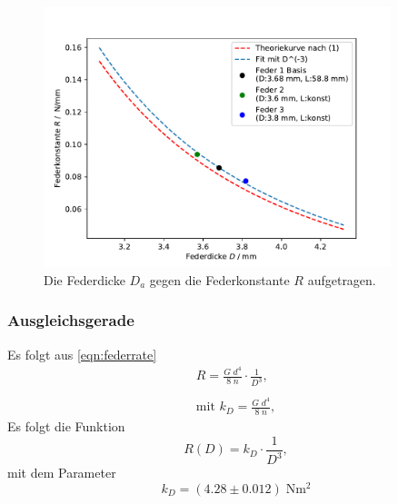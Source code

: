 \begin{figure}[H]
  \center
  \includegraphics[width=0.9\textwidth]{plots/dicke_konstante_dia.pdf}
  \caption{Die Federdicke $D_a$ gegen die Federkonstante $R$ aufgetragen.}
\end{figure}

\subsubsection{Ausgleichsgerade}

Es folgt aus \ref{eqn:federrate}
\begin{align*}
  R=\frac{G\;d^4}{8\;n}\cdot \frac{1}{D^3}, \\\\  
  \text{mit }k_D =\frac{G\;d^4}{8\;n},
\end{align*}
Es folgt die Funktion
\begin{equation*}
  R(D)=k_D \cdot \frac{1}{D^3},
\end{equation*}
mit dem Parameter
\begin{equation*}
  k_D=(4.28 \pm 0.012) \;\si{\N\meter\squared}
\end{equation*}


